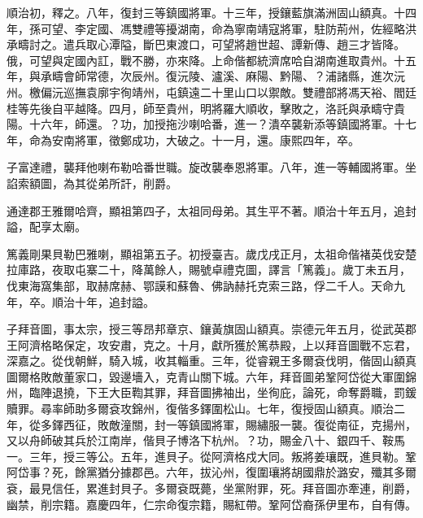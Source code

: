 \begin{pinyinscope}
順治初，釋之。八年，復封三等鎮國將軍。十三年，授鑲藍旗滿洲固山額真。十四年，孫可望、李定國、馮雙禮等擾湖南，命為寧南靖寇將軍，駐防荊州，佐經略洪承疇討之。遣兵取心潭隘，斷巴東渡口，可望將趙世超、譚新傳、趙三才皆降。俄，可望與定國內訌，戰不勝，亦來降。上命偕都統濟席哈自湖南進取貴州。十五年，與承疇會師常德，次辰州。復沅陵、瀘溪、麻陽、黔陽、？浦諸縣，進次沅州。檄偏沅巡撫袁廓宇徇靖州，屯鎮遠二十里山口以禦敵。雙禮部將馮天裕、閻廷桂等先後自平越降。四月，師至貴州，明將羅大順收，擊敗之，洛託與承疇守貴陽。十六年，師還。？功，加授拖沙喇哈番，進一？潰卒襲新添等鎮國將軍。十七年，命為安南將軍，徵鄭成功，大破之。十一月，還。康熙四年，卒。

子富達禮，襲拜他喇布勒哈番世職。旋改襲奉恩將軍。八年，進一等輔國將軍。坐諂索額圖，為其從弟所訐，削爵。

通達郡王雅爾哈齊，顯祖第四子，太祖同母弟。其生平不著。順治十年五月，追封謚，配享太廟。

篤義剛果貝勒巴雅喇，顯祖第五子。初授臺吉。歲戊戌正月，太祖命偕褚英伐安楚拉庫路，夜取屯寨二十，降萬餘人，賜號卓禮克圖，譯言「篤義」。歲丁未五月，伐東海窩集部，取赫席赫、鄂謨和蘇魯、佛訥赫托克索三路，俘二千人。天命九年，卒。順治十年，追封謚。

子拜音圖，事太宗，授三等昂邦章京、鑲黃旗固山額真。崇德元年五月，從武英郡王阿濟格略保定，攻安肅，克之。十月，獻所獲於篤恭殿，上以拜音圖戰不忘君，深嘉之。從伐朝鮮，騎入城，收其輜重。三年，從睿親王多爾袞伐明，偕固山額真圖爾格敗敵董家口，毀邊墻入，克青山關下城。六年，拜音圖弟鞏阿岱從大軍圍錦州，臨陣退撓，下王大臣鞫其罪，拜音圖拂袖出，坐徇庇，論死，命奪爵職，罰鍰贖罪。尋率師助多爾袞攻錦州，復偕多鐸圍松山。七年，復授固山額真。順治二年，從多鐸西征，敗敵潼關，封一等鎮國將軍，賜繡服一襲。復從南征，克揚州，又以舟師破其兵於江南岸，偕貝子博洛下杭州。？功，賜金八十、銀四千、鞍馬一。三年，授三等公。五年，進貝子。從阿濟格戍大同。叛將姜瓖既，進貝勒。鞏阿岱事？死，餘黨猶分據郡邑。六年，拔沁州，復圍瓖將胡國鼎於潞安，殲其多爾袞，最見信任，累進封貝子。多爾袞既薨，坐黨附罪，死。拜音圖亦牽連，削爵，幽禁，削宗籍。嘉慶四年，仁宗命復宗籍，賜紅帶。鞏阿岱裔孫伊里布，自有傳。


\end{pinyinscope}